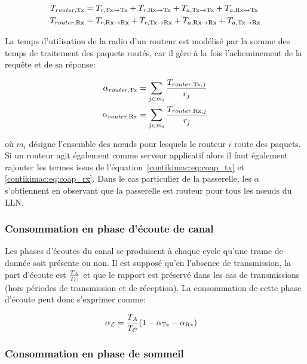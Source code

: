 \begin{align}
  T_{router, \textrm{Tx}} &= T_{r, \textrm{Tx} \to \textrm{Tx}} + T_{r, \textrm{Rx} \to \textrm{Tx}} + T_{a, \textrm{Tx} \to \textrm{Tx}} + T_{a, \textrm{Rx} \to \textrm{Tx}}\\
  T_{router, \textrm{Rx}} &= T_{r, \textrm{Rx} \to \textrm{Rx}} + T_{r, \textrm{Tx} \to \textrm{Rx}} + T_{a, \textrm{Rx} \to \textrm{Rx}} + T_{a, \textrm{Tx} \to \textrm{Rx}}
\end{align}

La temps d'utilisation de la radio d'un routeur est modélisé par la somme des temps de traitement des paquets routés, car il gère à la fois l'acheminement de la requête et de sa réponse:

\begin{align}
  \alpha_{router, \textrm{Tx}} &= \sum_{j \in m_i} \frac{T_{router, \textrm{Tx}, j}}{r_j}
  \label{contikimac:eq:router_tx}\\
  \alpha_{router, \textrm{Rx}} &= \sum_{j \in m_i} \frac{T_{router, \textrm{Rx}, j}}{r_j}
  \label{contikimac:eq:router_rx}
\end{align}

où $m_i$ désigne l'ensemble des nœuds pour lesquels le routeur $i$ route des paquets.
Si un routeur agit également comme serveur applicatif alors il faut également rajouter les termes issus de l'équation~\ref{contikimac:eq:coap_tx} et \ref{contikimac:eq:coap_rx}.
Dans le cas particulier de la passerelle, les $\alpha$ s'obtiennent en observant que la passerelle est routeur pour tous les nœuds du \ac{LLN}.

\subsubsection{Consommation en phase d'écoute de canal}

Les phases d'écoutes du canal se produisent à chaque cycle qu'une trame de donnée soit présente ou non.
Il est supposé qu'en l'absence de transmission, la part d'écoute est $\frac{T_A}{T_C}$ et que le rapport est préservé dans les cas de transmissions (hors périodes de transmission et de réception).
La consommation de cette phase d'écoute peut donc s'exprimer comme:

\begin{align}
  \alpha_{\mathcal{L}} &= \frac{T_A}{T_C}(1 - \alpha_{\textrm{Tx}} - \alpha_{\textrm{Rx}})
  \label{contikimac:eq:listening}
\end{align}

\subsubsection{Consommation en phase de sommeil}

